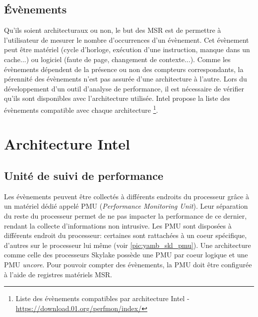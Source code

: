     \subsection{Évènements}
    
        Qu'ils soient architecturaux ou non, le but des MSR est de permettre à l'utilisateur de mesurer le nombre d'occurrences d'un évènement. Cet évènement peut être matériel (cycle d'horloge, exécution d'une instruction, manque dans un cache...) ou logiciel (faute de page, changement de contexte...). Comme les évènements dépendent de la présence ou non des compteurs correspondants, la pérennité des évènements n'est pas assurée d'une architecture à l'autre. Lors du développement d'un outil d'analyse de performance, il est nécessaire de vérifier qu'ils sont disponibles avec l'architecture utilisée. Intel propose la liste des évènements compatible avec chaque architecture \footnote{Liste des évènements compatibles par architecture Intel - \url{https://download.01.org/perfmon/index/}}.
      

  
\section{Architecture Intel}
    
    
    \subsection{Unité de suivi de performance}
     
        Les évènements peuvent être collectés à différents endroits du processeur grâce à un matériel dédié appelé PMU (\textit{Performance Monitoring Unit}). Leur séparation du reste du processeur permet de ne pas impacter la performance de ce dernier, rendant la collecte d'informations non intrusive. Les PMU sont disposées à différents endroit du processeur: certaines sont rattachées à un coeur spécifique, d'autres sur le processeur lui même (voir \autoref{pic:yamb_skl_pmu}).  Une architecture comme celle des processeurs Skylake possède une PMU par coeur logique et une PMU \textit{uncore}.  Pour pouvoir compter des évènements, la PMU doit être configurée à l'aide de registres matériels MSR.
            
